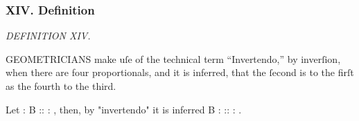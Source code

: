 \documentclass[11pt,preview]{standalone}
\begin{document}
\subsubsection{XIV. Definition}

\begin{minipage}{\textwidth}
    \begin{center}
        \textit{DEFINITION XIV.}\label{book5def14} \\
    \end{center}

    \hfill
\end{minipage}

\raggedright G\textsc{EOMETRICIANS} make uſe of the technical term “Invertendo,” by inverſion, when there are four proportionals, and it is inferred, that the ſecond is to the firſt as the fourth to the third.

\hfill

\hfill

Let {\color{cred}{A}} : B :: {\color{cblue}{C}} : {\color{cyellow}{D}}, then, by "invertendo" it is inferred B : {\color{cred}{A}} :: {\color{cyellow}{D}} : {\color{cblue}{C}}.
\end{document}
